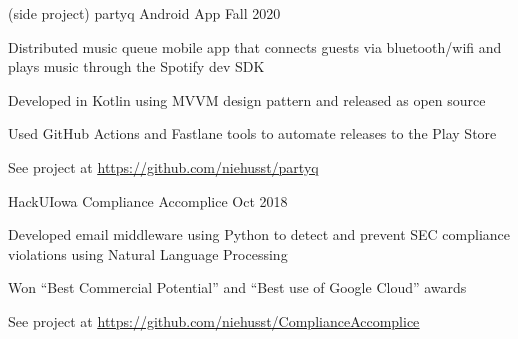\documentclass[11pt, a4paper]{awesome-cv}
\begin{document}
\begin{cventries}


  \cventry
    {(side project)}
    {partyq Android App}
    {Fall 2020}
    {}
    {
      \begin{cvitems}
        \item{Distributed music queue mobile app that connects guests via bluetooth/wifi and plays music through the Spotify dev SDK}
        \item{Developed in Kotlin using MVVM design pattern and released as open source}
        \item{Used GitHub Actions and Fastlane tools to automate releases to the Play Store}
        \item{See project at \underline{\href{https://github.com/niehusst/partyq}{https://github.com/niehusst/partyq}}}
      \end{cvitems}
    }


    \cventry
	{HackUIowa}
 	{Compliance Accomplice}
	{Oct 2018}
	{}
	{
	  \begin{cvitems}
	     \item{Developed email middleware using Python to detect and prevent SEC compliance violations using Natural Language Processing}
	     \item{Won “Best Commercial Potential” and “Best use of Google Cloud” awards}
	     \item{See project at \underline{\href{https://github.com/niehusst/ComplianceAccomplice}{https://github.com/niehusst/ComplianceAccomplice}}} 
	  \end{cvitems}
	}


\end{cventries}
\end{document}
